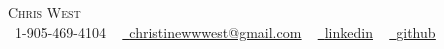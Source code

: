\documentclass[letterpaper,11pt]{article}
\newcommand{\resumeSubHeadingListStart}{\begin{itemize}[leftmargin=0.0in, label={}]}
\newcommand{\resumeSubHeadingListEnd}{\end{itemize}}
\begin{document}

\begin{center}
    {\Huge \scshape Chris West} \\ %
    \small \raisebox{-0.1\height}\faPhone\ 1-905-469-4104 ~ \href{mailto:christinewwwest@gmail.com}{\raisebox{-0.2\height}\faEnvelope\  \underline{christinewwwest@gmail.com}} ~ 
    \href{https://https://www.linkedin.com/in/chris-west-code-wrangler///}{\raisebox{-0.2\height}\faLinkedin\ \underline{linkedin}}  ~
    \href{https://https://github.com/Westc13/}{\raisebox{-0.2\height}\faGithub\ \underline{github}}
    \vspace{-8pt}
\end{center}



\end{document}
